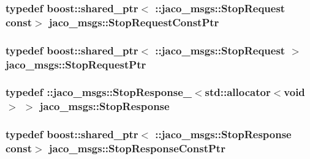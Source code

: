 \subsubsection[{\texorpdfstring{Stop\+Request\+Const\+Ptr}{StopRequestConstPtr}}]{\setlength{\rightskip}{0pt plus 5cm}typedef boost\+::shared\+\_\+ptr$<$ \+::{\bf jaco\+\_\+msgs\+::\+Stop\+Request} const$>$ {\bf jaco\+\_\+msgs\+::\+Stop\+Request\+Const\+Ptr}}\hypertarget{namespacejaco__msgs_ada14f57e263986dea014af1f67460020}{}\label{namespacejaco__msgs_ada14f57e263986dea014af1f67460020}
\subsubsection[{\texorpdfstring{Stop\+Request\+Ptr}{StopRequestPtr}}]{\setlength{\rightskip}{0pt plus 5cm}typedef boost\+::shared\+\_\+ptr$<$ \+::{\bf jaco\+\_\+msgs\+::\+Stop\+Request} $>$ {\bf jaco\+\_\+msgs\+::\+Stop\+Request\+Ptr}}\hypertarget{namespacejaco__msgs_aff2b98dafc6a922e9b7efac2f31dd988}{}\label{namespacejaco__msgs_aff2b98dafc6a922e9b7efac2f31dd988}
\subsubsection[{\texorpdfstring{Stop\+Response}{StopResponse}}]{\setlength{\rightskip}{0pt plus 5cm}typedef \+::{\bf jaco\+\_\+msgs\+::\+Stop\+Response\+\_\+}$<$std\+::allocator$<$void$>$ $>$ {\bf jaco\+\_\+msgs\+::\+Stop\+Response}}\hypertarget{namespacejaco__msgs_a2694506badd782d8dc5474717333e374}{}\label{namespacejaco__msgs_a2694506badd782d8dc5474717333e374}
\subsubsection[{\texorpdfstring{Stop\+Response\+Const\+Ptr}{StopResponseConstPtr}}]{\setlength{\rightskip}{0pt plus 5cm}typedef boost\+::shared\+\_\+ptr$<$ \+::{\bf jaco\+\_\+msgs\+::\+Stop\+Response} const$>$ {\bf jaco\+\_\+msgs\+::\+Stop\+Response\+Const\+Ptr}}\hypertarget{namespacejaco__msgs_a95d47cf915aaabdcee3a84ee1d2fe8a1}{}\label{namespacejaco__msgs_a95d47cf915aaabdcee3a84ee1d2fe8a1}

